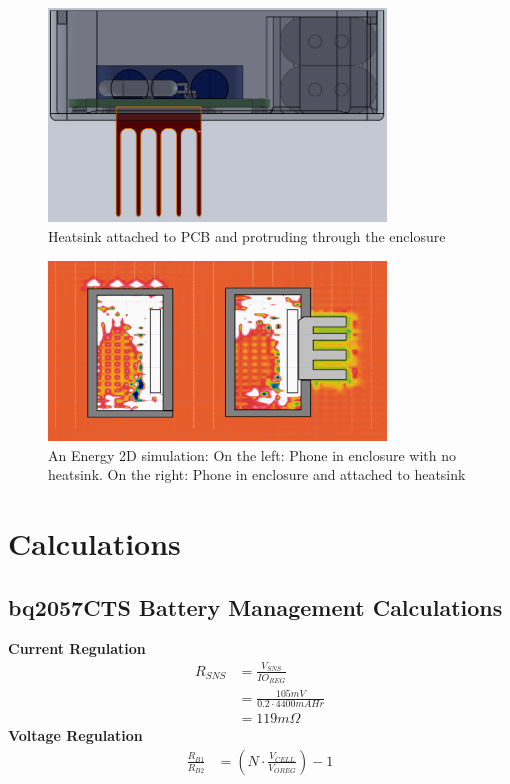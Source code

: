 \documentclass{article}
\numberwithin{figure}{section}
\numberwithin{equation}{section}
\begin{document}
{\begin{figure}[H]
	\centering
	\includegraphics[width=0.8\textwidth]{Assembly4}
	\caption{Heatsink attached to PCB and protruding through the enclosure}
	\label{fig:append_heatsink}
\end{figure}

\begin{figure}[H]
	\centering
	\includegraphics[width=0.8\textwidth]{thermal4}
	\caption{An Energy 2D simulation: On the left: Phone in enclosure with no heatsink. On the right: Phone in enclosure and attached to heatsink}
	\label{fig:append_thermal}
\end{figure}

\newpage
\section{Calculations} \label{sect:appendixD}
\subsection{bq2057CTS Battery Management Calculations} \label{sect:bqcalcs}
\textbf{Current Regulation}
\begin{align}
  \label{eq:currentreg}
  R_{SNS} &= \frac{V_{SNS}}{IO_{REG}} \\
  &= \frac{105mV}{0.2 \cdot 4400mAHr} \\
  &= 119m\Omega
\end{align}
\textbf{Voltage Regulation}
\begin{align}
  \label{eq:voltreg}
  \frac{R_{B1}}{R_{B2}} &= \left(N \cdot \frac{V_{CELL}}{V_{OREG}}\right) - 1
\end{align}

}
\end{document}
